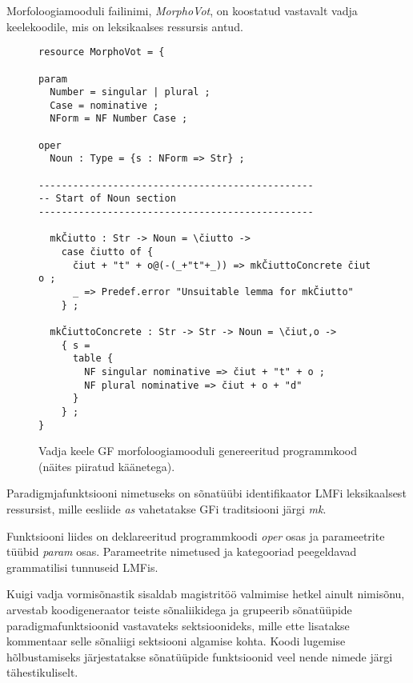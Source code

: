 \documentclass[12pt,a4paper]{article}
\begin{document}
Morfoloogiamooduli failinimi, \textit{MorphoVot}, on koostatud vastavalt vadja keele\-koodile, mis on leksikaalses ressursis antud.

\begin{figure}[ht]
  \center
\begin{verbatim}
resource MorphoVot = {

param
  Number = singular | plural ;
  Case = nominative ;
  NForm = NF Number Case ;

oper
  Noun : Type = {s : NForm => Str} ;

------------------------------------------------
-- Start of Noun section
------------------------------------------------

  mkČiutto : Str -> Noun = \čiutto -> 
    case čiutto of {
      čiut + "t" + o@(-(_+"t"+_)) => mkČiuttoConcrete čiut o ;
      _ => Predef.error "Unsuitable lemma for mkČiutto"
    } ;
  
  mkČiuttoConcrete : Str -> Str -> Noun = \čiut,o -> 
    { s =
      table {
        NF singular nominative => čiut + "t" + o ;
        NF plural nominative => čiut + o + "d"
      }
    } ;
}
\end{verbatim}
\caption{Vadja keele GF morfoloogia\-mooduli genereeritud programmkood (näites piiratud käänetega).
  \label{code:gf-morfoloogia}}
\end{figure}

Paradigmjafunktsiooni nimetuseks on sõnatüübi identifikaator LMFi leksikaalsest ressursist, mille eesliide \textit{as} vahetatakse GFi traditsiooni järgi \textit{mk}.

Funktsiooni liides on deklareeritud programmkoodi \textit{oper} osas ja parameetrite tüübid \textit{param} osas. Parameetrite nimetused ja kategooriad peegeldavad grammatilisi tunnuseid LMFis.

Kuigi vadja vormisõnastik sisaldab magistritöö valmimise hetkel ainult nimisõnu, arvestab koodi\-generaator teiste sõna\-liikidega ja grupeerib sõnatüüpide paradigma\-funktsioonid vastavateks sektsioonideks, mille ette lisatakse kommentaar selle sõnaliigi sektsiooni algamise kohta. Koodi lugemise hõlbustamiseks järjestatakse sõnatüüpide funktsioonid veel nende nimede järgi tähestikuliselt. 
\end{document}
